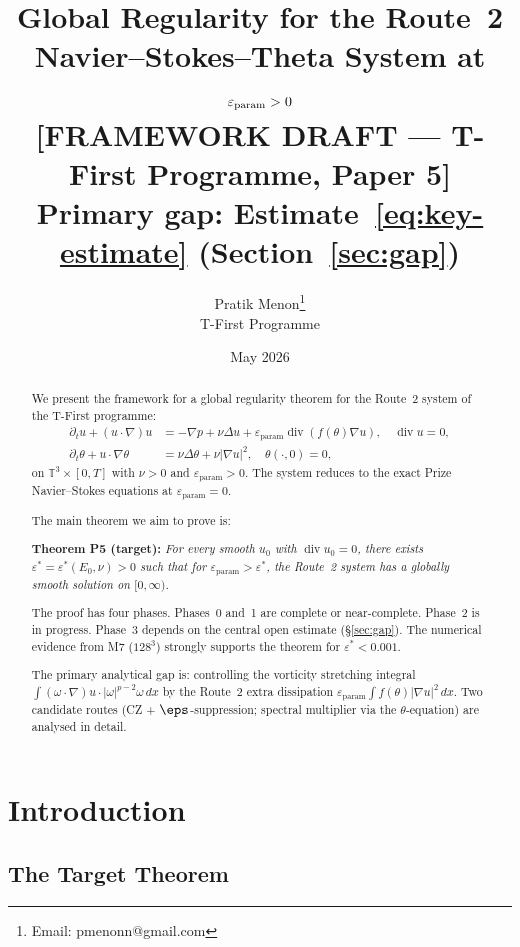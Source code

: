 \documentclass[11pt]{article}
\title{%
  Global Regularity for the Route~2\\
  Navier--Stokes--Theta System at $\epsp>0$\\[6pt]
  {\normalsize\color{red}\textbf{[FRAMEWORK DRAFT — T-First Programme, Paper 5]}}\\
  {\normalsize\color{red}Primary gap: Estimate~\eqref{eq:key-estimate} (Section~\ref{sec:gap})}
}
\author{%
  Pratik Menon\thanks{Email: pmenonn@gmail.com}
  \\[4pt]
  \small T-First Programme
}
\date{May 2026}
\theoremstyle{definition}
\theoremstyle{remark}
\newcommand{\T}{\mathbb{T}}
\newcommand{\dx}{\,dx}
\newcommand{\prt}{\partial_t}
\newcommand{\grad}{\nabla}
\newcommand{\divg}{\operatorname{div}}
\newcommand{\epsst}{\varepsilon^*}
\newcommand{\epsp}{\varepsilon_{\mathrm{param}}}
\begin{document}
\maketitle

\begin{abstract}
We present the framework for a global regularity theorem for the Route~2
system of the T-First programme:
\begin{align*}
  \prt u + (u\cdot\grad)u &= -\grad p + \nu\Delta u + \epsp\divg(f(\theta)\grad u),
  \quad \divg u = 0,\\
  \prt\theta + u\cdot\grad\theta &= \nu\Delta\theta + \nu|\grad u|^2,
  \quad \theta(\cdot,0) = 0,
\end{align*}
on $\T^3\times[0,T]$ with $\nu>0$ and $\epsp>0$.  The system reduces to the
exact Prize Navier--Stokes equations at $\epsp=0$.

\medskip

The main theorem we aim to prove is:

\begin{center}
\textbf{Theorem P5 (target):} \emph{For every smooth $u_0$ with $\divg u_0=0$,
there exists $\epsst=\epsst(E_0,\nu)>0$ such that for $\epsp>\epsst$, the
Route~2 system has a globally smooth solution on $[0,\infty)$.}
\end{center}

The proof has four phases.  Phases~0 and~1 are complete or near-complete.
Phase~2 is in progress.  Phase~3 depends on the central open estimate
(\S\ref{sec:gap}).  The numerical evidence from M7 ($128^3$) strongly supports
the theorem for $\epsst<0.001$.

\medskip

The primary analytical gap is: controlling the vorticity stretching integral
$\int(\omega\cdot\grad)u\cdot|\omega|^{p-2}\omega\dx$ by the Route~2 extra
dissipation $\epsp\int f(\theta)|\grad u|^2\dx$.  Two candidate routes
(CZ + $\eps$-suppression; spectral multiplier via the $\theta$-equation) are
analysed in detail.
\end{abstract}

\tableofcontents

\section{Introduction}
\label{sec:intro}

\subsection{The Target Theorem}
\end{document}
